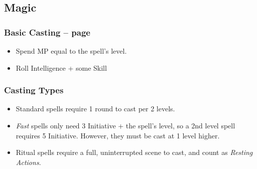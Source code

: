 \begin{multicols}{2}
\begin{itemize}
\end{itemize}

\subsection{Magic}

\subsubsection{Basic Casting -- page \pageref{basiccasting}}

\begin{itemize}

  \item{Spend MP equal to the spell's level.}
  \item{Roll Intelligence + some Skill}

\end{itemize}

\subsubsection{Casting Types}

\begin{itemize}

  \item{Standard spells require 1 round to cast per 2 levels.}
  \item{\textit{Fast} spells only need 3 Initiative + the spell's level, so a 2nd level spell requires 5 Initiative.
  However, they must be cast at 1 level higher.}
  \item{Ritual spells require a full, uninterrupted scene to cast, and count as \textit{Resting Actions}.}

\end{itemize}

\end{multicols}
